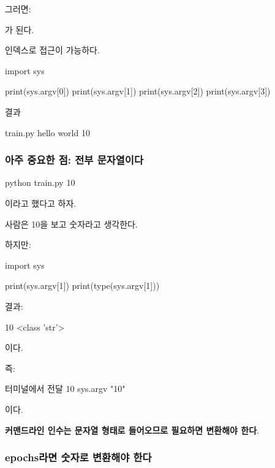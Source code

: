 그러면:

\begin{dhkzsh}
\end{dhkzsh}

가 된다.

인덱스로 접근이 가능하다.

\begin{dhkcode}
import sys

print(sys.argv[0])
print(sys.argv[1])
print(sys.argv[2])
print(sys.argv[3])
\end{dhkcode}

결과

\begin{dhkzsh}
train.py
hello
world
10
\end{dhkzsh}

\subsubsection{아주 중요한 점: 전부 문자열이다}

\begin{dhkzsh}
python train.py 10
\end{dhkzsh}

이라고 했다고 하자.

사람은 10을 보고 숫자라고 생각한다.

하지만:

\begin{dhkcode}
import sys

print(sys.argv[1])
print(type(sys.argv[1]))
\end{dhkcode}

결과:

\begin{dhkzsh}
10
<class 'str'>
\end{dhkzsh}

이다.

즉:

\begin{dhksmry}[centered]
터미널에서 전달
10
\da
sys.argv
\da
"10"
\end{dhksmry}

이다.

\textbf{커맨드라인 인수는 문자열 형태로 들어오므로 필요하면 변환해야 한다}.

\subsubsection{epochs라면 숫자로 변환해야 한다}

